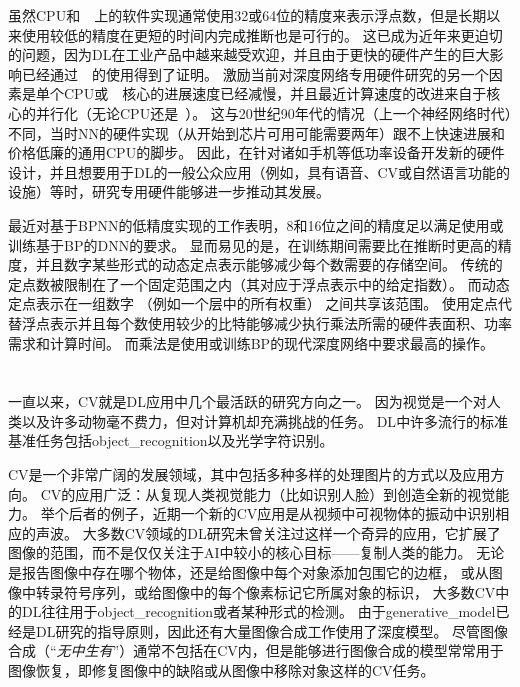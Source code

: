虽然CPU和~~上的软件实现通常使用32或64位的精度来表示浮点数，但是长期以来使用较低的精度在更短的时间内完成推断也是可行的\citep{Holt-et-al-1991,Holi+Hwang-1993,Presley-et-al-1994,Simard+Graf-NIPS1994,Wawrzynek-et-al-IEEE1996,Savich-et-al-2007}。
这已成为近年来更迫切的问题，因为\gls{DL}在工业产品中越来越受欢迎，并且由于更快的硬件产生的巨大影响已经通过~~的使用得到了证明。
激励当前对深度网络专用硬件研究的另一个因素是单个CPU或~~核心的进展速度已经减慢，并且最近计算速度的改进来自于核心的并行化（无论CPU还是~）。
这与20世纪90年代的情况（上一个神经网络时代）不同，当时\gls{NN}的硬件实现（从开始到芯片可用可能需要两年）跟不上快速进展和价格低廉的通用CPU的脚步。
因此，在针对诸如手机等低功率设备开发新的硬件设计，并且想要用于\gls{DL}的一般公众应用（例如，具有语音、\gls{CV}或自然语言功能的设施）等时，研究专用硬件能够进一步推动其发展。


最近对基于\gls{BP}\gls{NN}的低精度实现的工作\citep{Vanhoucke-et-al-2011,Courbariaux-et-al-ICLR2015workshop,Gupta-et-al-2015}表明，8和16位之间的精度足以满足使用或训练基于\gls{BP}的\gls{DNN}的要求。
显而易见的是，在训练期间需要比在推断时更高的精度，并且数字某些形式的动态定点表示能够减少每个数需要的存储空间。
传统的定点数被限制在了一个固定范围之内（其对应于浮点表示中的给定指数）。
而动态定点表示在一组数字 （例如一个层中的所有权重） 之间共享该范围。
使用定点代替浮点表示并且每个数使用较少的比特能够减少执行乘法所需的硬件表面积、功率需求和计算时间。
而乘法是使用或训练\gls{BP}的现代深度网络中要求最高的操作。



\section{}
\label{sec:computer_vision}

一直以来，\gls{CV}就是\gls{DL}应用中几个最活跃的研究方向之一。
因为视觉是一个对人类以及许多动物毫不费力，但对计算机却充满挑战的任务\citep{ballard1983parallel}。
\gls{DL}中许多流行的标准基准任务包括\gls{object_recognition}以及光学字符识别。


\gls{CV}是一个非常广阔的发展领域，其中包括多种多样的处理图片的方式以及应用方向。
\gls{CV}的应用广泛：从复现人类视觉能力（比如识别人脸）到创造全新的视觉能力。
举个后者的例子，近期一个新的\gls{CV}应用是从视频中可视物体的振动中识别相应的声波\citep{Davis2014VisualMic}。
大多数\gls{CV}领域的\gls{DL}研究未曾关注过这样一个奇异的应用，它扩展了图像的范围，而不是仅仅关注于\gls{AI}中较小的核心目标——复制人类的能力。
无论是报告图像中存在哪个物体，还是给图像中每个对象添加包围它的边框，
或从图像中转录符号序列，或给图像中的每个像素标记它所属对象的标识，
大多数\gls{CV}中的\gls{DL}往往用于\gls{object_recognition}或者某种形式的检测。
由于\gls{generative_model}已经是\gls{DL}研究的指导原则，因此还有大量图像合成工作使用了深度模型。
尽管图像合成（``\emph{无中生有}''）通常不包括在\gls{CV}内，但是能够进行图像合成的模型常常用于图像恢复，即修复图像中的缺陷或从图像中移除对象这样的\gls{CV}任务。

